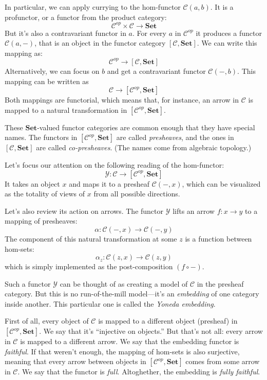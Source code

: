 \documentclass[DaoFP]{subfiles}
\begin{document}
In particular, we can apply currying to the hom-functor $\mathcal{C}(a, b)$. It is a profunctor, or a functor from the product category:
\[ \mathcal{C}^{op} \times \mathcal{C} \to  \mathbf{Set} \]
But it's also a contravariant functor in $a$. For every $a$ in  $\mathcal{C}^{op}$  it produces a functor $\mathcal{C}(a, -)$, that is an object in the functor category $ [\mathcal{C},  \mathbf{Set}] $. We can write this mapping as:
\[ \mathcal{C}^{op} \to [\mathcal{C},  \mathbf{Set}] \]
Alternatively, we can focus on $b$ and get a contravariant functor $\mathcal{C}(-, b)$. This mapping can be written as
\[ \mathcal{C} \to [\mathcal{C}^{op},  \mathbf{Set}] \]
Both mappings are functorial, which means that, for instance, an arrow in $\mathcal{C}$ is mapped to a natural transformation in $[\mathcal{C}^{op},  \mathbf{Set}]$.

These $\mathbf{Set}$-valued functor categories are common enough that they have special names. The functors in $[\mathcal{C}^{op},  \mathbf{Set}]$ are called \emph{presheaves}, and the ones in $[\mathcal{C},  \mathbf{Set}]$ are called \emph{co-presheaves}. (The names come from algebraic topology.)

Let's focus our attention on the following reading of the hom-functor:
\[ \mathcal{Y} \colon \mathcal{C} \to [\mathcal{C}^{op},  \mathbf{Set}] \]
It takes an object $x$ and maps it to a presheaf $\mathcal{C}(-, x)$, which can be visualized as the totality of views of $x$ from all possible directions.

Let's also review its action on arrows. The functor $\mathcal{Y}$ lifts an arrow $f \colon x \to y$ to a mapping of presheaves:
\[ \alpha \colon \mathcal{C}(-, x) \to \mathcal{C}(-, y) \]
The component of this natural transformation at some $z$ is a function between hom-sets:
\[ \alpha_z \colon \mathcal{C}(z, x) \to \mathcal{C}(z, y) \]
which is simply implemented as the post-composition $(f \circ -)$.

Such a functor $\mathcal{Y}$ can be thought of as creating a model of $\mathcal{C}$ in the presheaf category. But this is no run-of-the-mill model---it's an \emph{embedding} of one category inside another. This particular one is called the \emph{Yoneda embedding}. 

First of all, every object of $\mathcal{C}$ is mapped to a different object (presheaf) in $[\mathcal{C}^{op},  \mathbf{Set}]$. We say that it's ``injective on objects.'' But that's not all: every arrow in $\mathcal{C}$ is mapped to a different arrow. We say that the embedding functor is \emph{faithful}. If that weren't enough, the mapping of hom-sets is also surjective, meaning that every arrow between objects in $[\mathcal{C}^{op},  \mathbf{Set}]$ comes from some arrow in $\mathcal{C}$. We say that the functor is \emph{full}. Altoghether, the embedding is \emph{fully faithful}.
\end{document}
